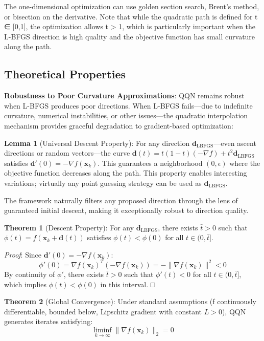 The one-dimensional optimization can use golden section search, Brent's method, or bisection on the derivative.
Note that while the quadratic path is defined for t ∈ {[}0,1{]}, the optimization allows t \textgreater{} 1, which is particularly important when the L-BFGS direction is high quality and the objective function has small curvature along the path.

\hypertarget{theoretical-properties}{%
\subsection{Theoretical Properties}\label{theoretical-properties}}

\textbf{Robustness to Poor Curvature Approximations}: QQN remains robust when L-BFGS produces poor directions.
When L-BFGS fails---due to indefinite curvature, numerical instabilities, or other issues---the quadratic interpolation mechanism provides graceful degradation to gradient-based optimization:

\textbf{Lemma 1} (Universal Descent Property): For any direction \(\mathbf{d}_{\text{LBFGS}}\)---even ascent directions or random vectors---the curve \(\mathbf{d}(t) = t(1-t)(-\nabla f) + t^2 \mathbf{d}_{\text{LBFGS}}\) satisfies \(\mathbf{d}'(0) = -\nabla f(\mathbf{x}_k)\).
This guarantees a neighborhood \((0, \epsilon)\) where the objective function decreases along the path.
This property enables interesting variations; virtually any point guessing strategy can be used as \(\mathbf{d}_{\text{LBFGS}}\).

The framework naturally filters any proposed direction through the lens of guaranteed initial descent, making it exceptionally robust to direction quality.

\textbf{Theorem 1} (Descent Property): For any \(\mathbf{d}_{\text{LBFGS}}\), there exists \(\bar{t} > 0\) such that \(\phi(t) = f(\mathbf{x}_k + \mathbf{d}(t))\) satisfies \(\phi(t) < \phi(0)\) for all \(t \in (0, \bar{t}]\).

\emph{Proof}: Since \(\mathbf{d}'(0) = -\nabla f(\mathbf{x}_k)\):
\[\phi'(0) = \nabla f(\mathbf{x}_k)^T (-\nabla f(\mathbf{x}_k)) = -\|\nabla f(\mathbf{x}_k)\|^2 < 0\]
By continuity of \(\phi'\), there exists \(\bar{t} > 0\) such that \(\phi'(t) < 0\) for all \(t \in (0, \bar{t}]\), which implies \(\phi(t) < \phi(0)\) in this interval. □

\textbf{Theorem 2} (Global Convergence): Under standard assumptions (f continuously differentiable, bounded below, Lipschitz gradient with constant \(L > 0\)), QQN generates iterates satisfying:
\[\liminf_{k \to \infty} \|\nabla f(\mathbf{x}_k)\|_2 = 0\]

